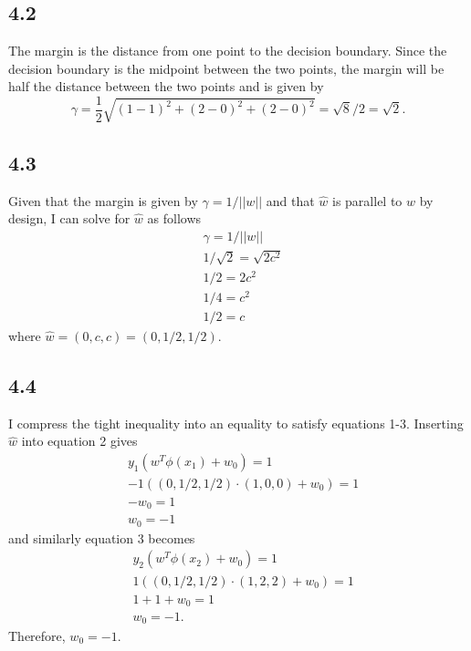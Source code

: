 \documentclass[12pt]{amsart}
\begin{document}
\subsection*{4.2}
The margin is the distance from one point to the decision boundary.  Since the decision boundary is the midpoint between the two points, the margin will be half the distance between the two points and is given by
\begin{equation}
\gamma = \frac{1}{2}\sqrt{(1-1)^2 + (2-0)^2 + (2-0)^2} = \sqrt{8}/2 = \sqrt{2}.
\end{equation}

\subsection*{4.3}
Given that the margin is given by $\gamma = 1/||w||$ and that $\hat{w}$ is parallel to $w$ by design, I can solve for $\hat{w}$ as follows
\begin{equation}
\begin{split}
& \gamma = 1/||w|| \\
& 1/\sqrt{2} = \sqrt{2c^2} \\ 
& 1/2 = 2c^2 \\
& 1/4 = c^2 \\
& 1/2 = c 
\end{split}
\end{equation}
where $\hat{w} = (0,c,c) = (0,1/2,1/2)$.

\subsection*{4.4}
I compress the tight inequality into an equality to satisfy equations 1-3.  Inserting $\hat{w}$ into equation 2 gives
\begin{equation}
\begin{split}
& y_1(w^T\phi(x_1) + w_0) = 1 \\
& -1((0,1/2,1/2) \cdot (1,0,0) + w_0) = 1 \\
& -w_0 = 1 \\
& w_0 = -1
\end{split}
\end{equation}
and similarly equation 3 becomes 
\begin{equation}
\begin{split}
& y_2(w^T\phi(x_2) + w_0) = 1 \\
& 1((0,1/2,1/2) \cdot (1,2,2) + w_0) = 1 \\
& 1 + 1 + w_0 = 1 \\
& w_0 = -1.
\end{split}
\end{equation}
Therefore, $w_0 = -1$.
\end{document}

